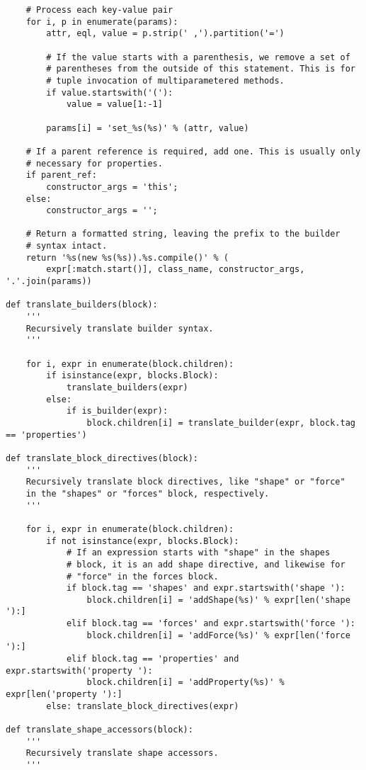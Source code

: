 \begin{lstlisting}
    # Process each key-value pair
    for i, p in enumerate(params):
        attr, eql, value = p.strip(' ,').partition('=')

        # If the value starts with a parenthesis, we remove a set of
        # parentheses from the outside of this statement. This is for
        # tuple invocation of multiparametered methods.
        if value.startswith('('):
            value = value[1:-1]

        params[i] = 'set_%s(%s)' % (attr, value)

    # If a parent reference is required, add one. This is usually only
    # necessary for properties.
    if parent_ref:
        constructor_args = 'this';
    else:
        constructor_args = '';

    # Return a formatted string, leaving the prefix to the builder
    # syntax intact.
    return '%s(new %s(%s)).%s.compile()' % (
        expr[:match.start()], class_name, constructor_args, '.'.join(params))

def translate_builders(block):
    '''
    Recursively translate builder syntax.
    '''

    for i, expr in enumerate(block.children):
        if isinstance(expr, blocks.Block):
            translate_builders(expr)
        else:
            if is_builder(expr):
                block.children[i] = translate_builder(expr, block.tag == 'properties')

def translate_block_directives(block):
    '''
    Recursively translate block directives, like "shape" or "force"
    in the "shapes" or "forces" block, respectively.
    '''

    for i, expr in enumerate(block.children):
        if not isinstance(expr, blocks.Block):
            # If an expression starts with "shape" in the shapes
            # block, it is an add shape directive, and likewise for
            # "force" in the forces block.
            if block.tag == 'shapes' and expr.startswith('shape '):
                block.children[i] = 'addShape(%s)' % expr[len('shape '):]
            elif block.tag == 'forces' and expr.startswith('force '):
                block.children[i] = 'addForce(%s)' % expr[len('force '):]
            elif block.tag == 'properties' and expr.startswith('property '):
                block.children[i] = 'addProperty(%s)' % expr[len('property '):]
        else: translate_block_directives(expr)

def translate_shape_accessors(block):
    '''
    Recursively translate shape accessors.
    '''


\end{lstlisting}
